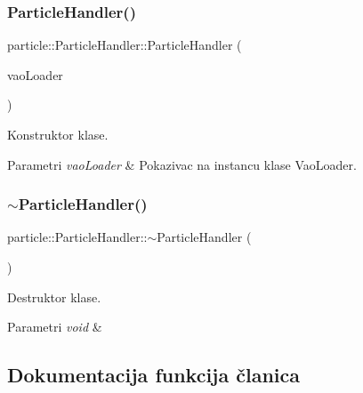 \subsubsection{\texorpdfstring{Particle\+Handler()}{ParticleHandler()}}
{\footnotesize\ttfamily particle\+::\+Particle\+Handler\+::\+Particle\+Handler (\begin{DoxyParamCaption}\item[{\hyperlink{classcore_1_1VaoLoader}{Vao\+Loader} $\ast$}]{vao\+Loader }\end{DoxyParamCaption})}



Konstruktor klase. 


\begin{DoxyParams}{Parametri}
{\em vao\+Loader} & Pokazivac na instancu klase Vao\+Loader. \\
\hline
\end{DoxyParams}
\mbox{\label{classparticle_1_1ParticleHandler_aeaecb7a63b98e839a0b939c17aff28d3}} 
\subsubsection{\texorpdfstring{$\sim$\+Particle\+Handler()}{~ParticleHandler()}}
{\footnotesize\ttfamily particle\+::\+Particle\+Handler\+::$\sim$\+Particle\+Handler (\begin{DoxyParamCaption}{ }\end{DoxyParamCaption})}



Destruktor klase. 


\begin{DoxyParams}{Parametri}
{\em void} & \\
\hline
\end{DoxyParams}


\subsection{Dokumentacija funkcija članica}
\mbox{\label{classparticle_1_1ParticleHandler_a030ab0b73bb572f706fb03c5cfc2fedf}} 
